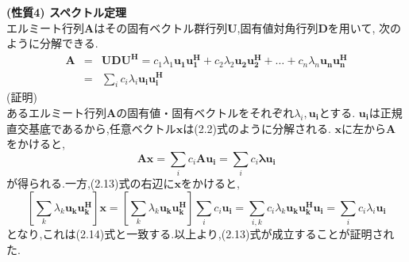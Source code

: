 \vspace{5mm}
\noindent\textbf{(性質4) \quad スペクトル定理} \\
エルミート行列$\bm{A}$はその固有ベクトル群行列$\bm{U}$,固有値対角行列$\bm{D}$を用いて,
次のように分解できる. \\
\begin{eqnarray}
    \bm{A} &=& \bm{UDU^H} = c_1\lambda_1\bm{u_1u_1^H}+c_2\lambda_2\bm{u_2u_2^H}+\ldots+c_n\lambda_n\bm{u_nu_n^H} \nonumber \\
    &=& \sum_i c_i\lambda_i\bm{u_iu_i^H}
\end{eqnarray}
\vspace{3mm}
(証明) \\
あるエルミート行列$\bm{A}$の固有値・固有ベクトルをそれぞれ$\lambda_i,\bm{u_i}$とする.
$\bm{u_i}$は正規直交基底であるから,任意ベクトル$\bm{x}$は(2.2)式のように分解される.
$\bm{x}$に左から$\bm{A}$をかけると,
\begin{equation}
    \bm{Ax} = \sum_i c_i\bm{Au_i} = \sum_i c_i\bm{\lambda u_i}
\end{equation}
が得られる.一方,(2.13)式の右辺に$\bm{x}$をかけると,
\begin{equation}
    \left[
        \sum_k \lambda_k\bm{u_ku_k^H}
    \right]\bm{x}
    = \left[
        \sum_k \lambda_k\bm{u_ku_k^H}
    \right]\sum_i c_i\bm{u_i}
    = \sum_{i,k} c_i\lambda_k\bm{u_ku_k^Hu_i}
    = \sum_i c_i\lambda_i\bm{u_i} \nonumber
\end{equation}
となり,これは(2.14)式と一致する.以上より,(2.13)式が成立することが証明された.

